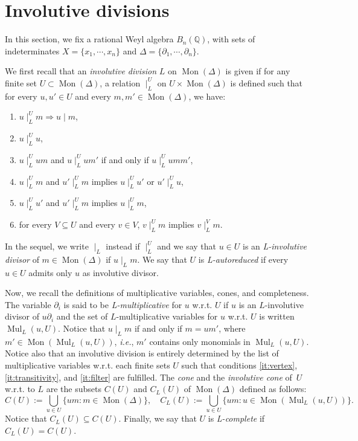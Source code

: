\documentclass[10pt]{easychair}
\theoremstyle{definition}
\newcommand\ie{\emph{i.e.}}
\newcommand\Q{\mathbb{Q}}
\newcommand\Weyl[1]{B_{#1}(\Q)}
\DeclareMathOperator{\Mon}{Mon}
\DeclareMathOperator{\Mul}{Mul}
\newcommand\divInv[1]{\mid_{#1}}
\begin{document}
\section{Involutive divisions}

In this section, we fix a rational Weyl algebra $\Weyl{n}$, with sets of
indeterminates $X=\{x_1,\cdots,x_n\}$ and
$\Delta=\{\partial_1,\cdots,\partial_n\}$. 
\medskip

We first recall that an {\em involutive division} $L$ on $\Mon(\Delta)$
is given if for any finite set $U\subset\Mon(\Delta)$, a relation
$\divInv{L}^U$ on $U\times\Mon(\Delta)$ is defined such that for every
$u,u'\in U$ and every $m,m'\in\Mon(\Delta)$, we have:
\begin{enumerate}[label=\alph*)]
\item $u\divInv{L}^Um\Rightarrow u\mid m$,
\item $u\divInv{L}^Uu$,
\item $u\divInv{L}^Uum$ and $u\divInv{L}^Uum'$ if and only if
  $u\divInv{L}^Uumm'$,
\item\label{it:vertex} $u\divInv{L}^Um$ and $u'\divInv{L}^Um$ implies
  $u\divInv{L}^Uu'$ or $u'\divInv{L}^Uu$,
\item\label{it:transitivity} $u\divInv{L}^Uu'$ and $u'\divInv{L}^Um$
  implies $u\divInv{L}^Um$,
\item\label{it:filter} for every $V\subseteq U$ and every $v\in V$,
  $v\divInv{L}^Um$ implies $v\divInv{L}^Vm$. 
\end{enumerate}
In the sequel, we write $\divInv{L}$ instead if $\divInv{L}^U$ and we say
that $u\in U$ is an {\em L-involutive divisor} of $m\in\Mon(\Delta)$ if
$u\divInv{L}m$. We say that $U$ is {\em L-autoreduced} if every $u\in U$
admits only $u$ as involutive divisor.
\medskip

Now, we recall the definitions of multiplicative variables, cones, and
completeness. The variable $\partial_i$ is said to be
{\em L-multiplicative} for $u$ w.r.t. $U$ if $u$ is an $L$-involutive
divisor of $u\partial_i$ and the set of $L$-multiplicative variables for
$u$ w.r.t. $U$ is written $\Mul_L(u,U)$. Notice that $u\divInv{L}m$ if
and only if $m=um'$, where $m'\in\Mon(\Mul_L(u,U))$, \ie, $m'$ contains
only monomials in $\Mul_L(u,U)$. Notice also that an involutive division
is entirely determined by the list of multiplicative variables w.r.t.
each finite sets $U$ such that conditions \ref{it:vertex},
\ref{it:transitivity}, and \ref{it:filter} are fulfilled. The {\em cone}
and the {\em involutive cone} of~$U$ w.r.t. to  $L$ are the subsets
$C(U)$ and $C_L(U)$ of $\Mon(\Delta)$ defined as follows:
\[C(U):=\bigcup_{u\in U}\{um: m\in\Mon(\Delta)\},\quad
C_L(U):=\bigcup_{u\in U}\{um: u\in\Mon(\Mul_L(u,U))\}.\]
Notice that $C_L(U)\subseteq C(U)$. Finally, we say that $U$ is
{\em L-complete} if $C_L(U)=C(U)$. 
\smallskip
\end{document}
